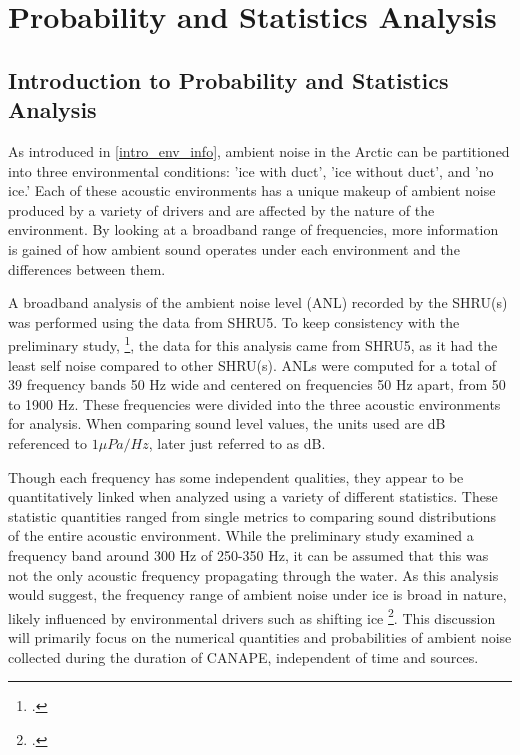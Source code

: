 
\chapter{Probability and Statistics Analysis} \label{sec_probsnstat}


\section{Introduction to Probability and Statistics Analysis} \label{sec_statintro}


As introduced in \autoref{intro_env_info}, ambient noise in the Arctic can be partitioned into three environmental conditions: 'ice with duct', 'ice without duct', and 'no ice.' Each of these acoustic environments has a unique makeup of ambient noise produced by a variety of drivers and are affected by the nature of the environment. By looking at a broadband range of frequencies, more information is gained of how ambient sound operates under each environment and the differences between them.  

A broadband analysis of the ambient noise level (ANL) recorded by the SHRU(s) was performed using the data from SHRU5. To keep consistency with the preliminary study, \footcite[]{Bonnel2021}, the data for this analysis came from SHRU5, as it had the least self noise compared to other SHRU(s). ANLs were computed for a total of 39 frequency bands 50 Hz wide and centered on frequencies 50 Hz apart, from 50 to 1900 Hz. These frequencies were divided into the three acoustic environments for analysis. When comparing sound level values, the units used are dB referenced to $1 \mu Pa/Hz $, later just referred to as dB. %

Though each frequency has some independent qualities, they appear to be quantitatively linked when analyzed using a variety of different statistics. These statistic quantities ranged from single metrics to comparing sound distributions of the entire acoustic environment. While the preliminary study examined a frequency band around 300 Hz of 250-350 Hz, it can be assumed that this was not the only acoustic frequency propagating through the water. As this analysis would suggest, the frequency range of ambient noise under ice is broad in nature, likely influenced by environmental drivers such as shifting ice \footcite[]{ice_enviro}. This discussion will primarily focus on the numerical quantities and probabilities of ambient noise collected during the duration of CANAPE, independent of time and sources.



